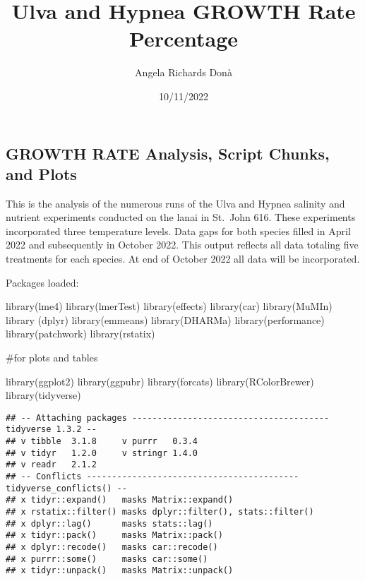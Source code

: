 \documentclass[
]{article}
\title{Ulva and Hypnea GROWTH Rate Percentage}
\author{Angela Richards Donà}
\date{10/11/2022}
\newenvironment{Shaded}{\begin{snugshade}}{\end{snugshade}}
\newcommand{\FunctionTok}[1]{\textcolor[rgb]{0.00,0.00,0.00}{#1}}
\newcommand{\NormalTok}[1]{#1}
\begin{document}
\maketitle

\hypertarget{growth-rate-analysis-script-chunks-and-plots}{%
\subsection{GROWTH RATE Analysis, Script Chunks, and
Plots}\label{growth-rate-analysis-script-chunks-and-plots}}

This is the analysis of the numerous runs of the Ulva and Hypnea
salinity and nutrient experiments conducted on the lanai in St.~John
616. These experiments incorporated three temperature levels. Data gaps
for both species filled in April 2022 and subsequently in October 2022.
This output reflects all data totaling five treatments for each species.
At end of October 2022 all data will be incorporated.

Packages loaded:

\begin{Shaded}
\begin{Highlighting}[]
\FunctionTok{library}\NormalTok{(lme4)}
\FunctionTok{library}\NormalTok{(lmerTest)}
\FunctionTok{library}\NormalTok{(effects)}
\FunctionTok{library}\NormalTok{(car)}
\FunctionTok{library}\NormalTok{(MuMIn)}
\FunctionTok{library}\NormalTok{ (dplyr)}
\FunctionTok{library}\NormalTok{(emmeans)}
\FunctionTok{library}\NormalTok{(DHARMa)}
\FunctionTok{library}\NormalTok{(performance)}
\FunctionTok{library}\NormalTok{(patchwork)}
\FunctionTok{library}\NormalTok{(rstatix)}
\end{Highlighting}
\end{Shaded}

\#for plots and tables

\begin{Shaded}
\begin{Highlighting}[]
\FunctionTok{library}\NormalTok{(ggplot2)}
\FunctionTok{library}\NormalTok{(ggpubr)}
\FunctionTok{library}\NormalTok{(forcats)}
\FunctionTok{library}\NormalTok{(RColorBrewer)}
\FunctionTok{library}\NormalTok{(tidyverse)}
\end{Highlighting}
\end{Shaded}

\begin{verbatim}
## -- Attaching packages --------------------------------------- tidyverse 1.3.2 --
## v tibble  3.1.8     v purrr   0.3.4
## v tidyr   1.2.0     v stringr 1.4.0
## v readr   2.1.2     
## -- Conflicts ------------------------------------------ tidyverse_conflicts() --
## x tidyr::expand()   masks Matrix::expand()
## x rstatix::filter() masks dplyr::filter(), stats::filter()
## x dplyr::lag()      masks stats::lag()
## x tidyr::pack()     masks Matrix::pack()
## x dplyr::recode()   masks car::recode()
## x purrr::some()     masks car::some()
## x tidyr::unpack()   masks Matrix::unpack()
\end{verbatim}
\end{document}
